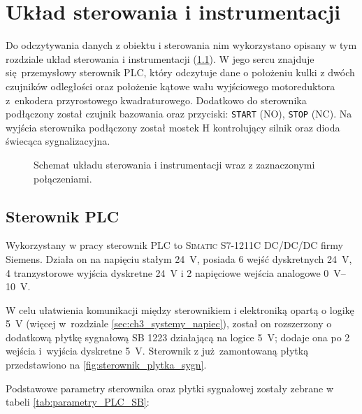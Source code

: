 \chapter{Układ sterowania i instrumentacji}
\label{cha:ch3_uklad_ster_i_instrumentacji}

Do odczytywania danych z obiektu i sterowania nim wykorzystano opisany w tym rozdziale układ sterowania i instrumentacji (\cref{fig:schemat_ukl_sterowania_instrumentacji}). W jego sercu znajduje się przemysłowy sterownik PLC, który odczytuje dane o położeniu kulki z dwóch czujników odległości oraz położenie kątowe wału wyjściowego motoreduktora z~enkodera przyrostowego kwadraturowego. Dodatkowo do sterownika podłączony został czujnik bazowania oraz przyciski: \texttt{START} (NO), \texttt{STOP} (NC). Na wyjścia sterownika podłączony został mostek H kontrolujący silnik oraz dioda świecąca sygnalizacyjna.

\begin{figure}[H]
    \centering
    
    \caption{Schemat układu sterowania i instrumentacji wraz z zaznaczonymi połączeniami.}
    \label{fig:schemat_ukl_sterowania_instrumentacji}
\end{figure}

\section{Sterownik PLC}
\label{sec:ch3_PLC}

Wykorzystany w pracy sterownik PLC to \textsc{Simatic S7-1211C DC/DC/DC} firmy Siemens. Działa on na napięciu stałym \SI{24}{V}, posiada 6 wejść dyskretnych \SI{24}{V}, 4 tranzystorowe wyjścia dyskretne \SI{24}{V} i 2 napięciowe wejścia analogowe \SIrange{0}{10}{V}.

W celu ułatwienia komunikacji między sterownikiem i elektroniką opartą o logikę \SI{5}{V} (więcej w~rozdziale \ref{sec:ch3_systemy_napiec}), został on rozszerzony o dodatkową płytkę sygnałową SB 1223 działającą na logice \SI{5}{V}; dodaje ona po 2 wejścia i~wyjścia dyskretne \SI{5}{V}. Sterownik z już zamontowaną płytką przedstawiono na \cref{fig:sterownik_plytka_sygn}.

Podstawowe parametry sterownika oraz płytki sygnałowej zostały zebrane w tabeli \ref{tab:parametry_PLC_SB}:

